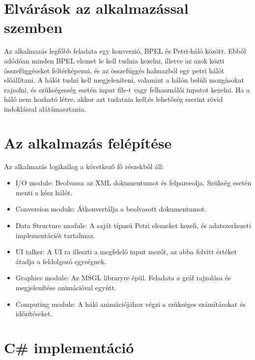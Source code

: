 \documentclass[12pt,a4paper]{book}
\begin{document}

\section{Elvárások az alkalmazással szemben}

Az alkalmazás legfőbb feladata egy konverzió, BPEL és Petri-háló között. Ebből adódóan minden BPEL elemet le kell tudnia kezelni, illetve az azok közti összefüggéseket feltérképezni, és az összefüggés halmazból egy petri hálót előállítani. A hálót tudni kell megjeleníteni, valamint a hálón belüli mozgásokat rajzolni, és szükségesség esetén input file-t vagy felhasználói inputot kezelni. Ha a háló nem hozható létre, akkor azt tudatnia kell,és lehetőség szerint rövid indoklással alátámasztania. 

\section{Az alkalmazás felépítése}

Az alkalmazás logikailag a következő fő részekből áll:
\begin{itemize}
\item I/O module: Beolvassa az XML dokumentumot és felparseolja. Szükség esetén menti a kész hálót.
\item Conversion module: Átkonvertálja  a beolvasott dokumentumot.
\item Data Structure module: A saját típusú Petri elemeket kezeli, és adatszerkezeti implementációt tartalmaz. 
\item UI talker: A UI ra illeszti a megfelelő input mezőt, az abba felvitt értéket átadja a feldolgozó egységnek.
\item Graphics module: Az MSGL libraryre épül. Feladata a gráf rajzolása és megjelenítése animációval együtt. 
\item Computing module: A háló animációjához végzi a szükséges számításokat és időzítéseket. 
\end{itemize}

\section{C\# implementáció}

\end{document}
